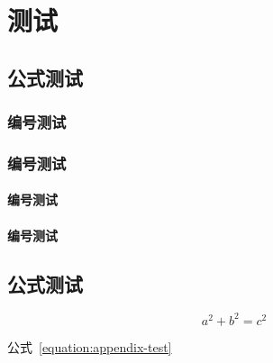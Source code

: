 \documentclass[type = master,class = academic]{whu-thesis}
\begin{document}
\chapter{测试}

\section{公式测试}
\subsection{编号测试}
\subsection{编号测试}
\subsubsection{编号测试}
\subsubsection{编号测试}

\section{公式测试}

\begin{equation}\label{equation:appendix-test}
  a^2 + b^2 = c^2
\end{equation}

公式~\eqref{equation:appendix-test}
\end{document}
